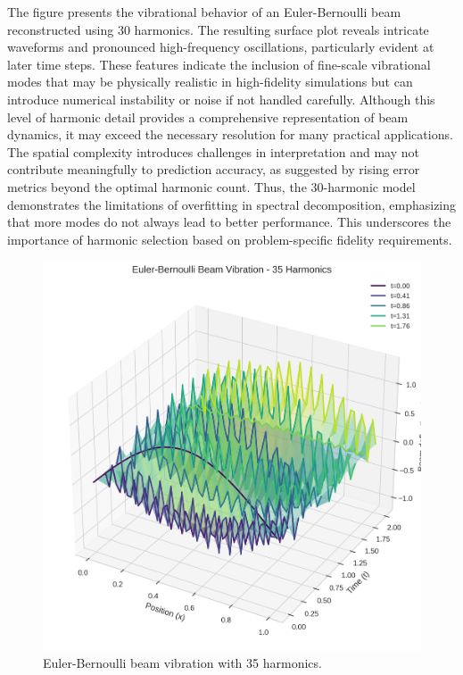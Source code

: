 \documentclass[preprint,12pt]{elsarticle}
\begin{document}
The figure presents the vibrational behavior of an Euler-Bernoulli beam reconstructed using 30 harmonics. The resulting surface plot reveals intricate waveforms and pronounced high-frequency oscillations, particularly evident at later time steps. These features indicate the inclusion of fine-scale vibrational modes that may be physically realistic in high-fidelity simulations but can introduce numerical instability or noise if not handled carefully. Although this level of harmonic detail provides a comprehensive representation of beam dynamics, it may exceed the necessary resolution for many practical applications. The spatial complexity introduces challenges in interpretation and may not contribute meaningfully to prediction accuracy, as suggested by rising error metrics beyond the optimal harmonic count. Thus, the 30-harmonic model demonstrates the limitations of overfitting in spectral decomposition, emphasizing that more modes do not always lead to better performance. This underscores the importance of harmonic selection based on problem-specific fidelity requirements.

\begin{figure}[t]
    \centering
    \includegraphics[width=0.9\linewidth]{figures/euler_bernoulli_3d_35h.png}
    \caption{Euler-Bernoulli beam vibration with 35 harmonics.}
    \label{fig:euler_35h}
\end{figure}
\end{document}
